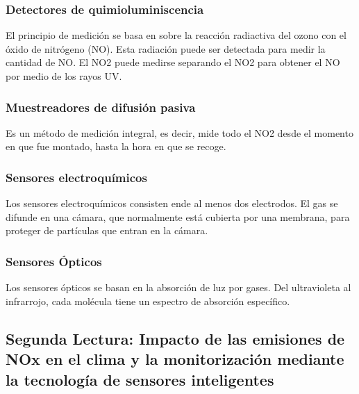 \documentclass[10pt,a4paper]{article}
\begin{document}
\begin{multicols}{2}
\begin{itemize}
\subsubsection{Detectores de quimioluminiscencia}
El principio de medición se basa en sobre la reacción radiactiva
del ozono con el óxido de nitrógeno (NO).
Esta radiación puede ser detectada para medir la
cantidad de NO. El NO2 puede medirse separando
el NO2 para obtener el NO por medio de los
rayos UV.

\subsubsection{Muestreadores de difusión pasiva}
Es un método
de medición integral, es decir, mide todo el NO2
desde el momento en que fue montado, hasta la
hora en que se recoge.


\subsubsection{Sensores electroquímicos}
Los sensores electroquímicos consisten ende al menos dos electrodos.
El gas se difunde en una cámara, que normalmente
está cubierta por una membrana, para
proteger de partículas que entran en la cámara.



\subsubsection{Sensores Ópticos}
Los sensores ópticos se basan
en la absorción de luz por gases. Del ultravioleta
al infrarrojo, cada molécula tiene un espectro
de absorción específico.

\subsection{Segunda Lectura: Impacto de las emisiones de NOx en el clima y la monitorización mediante la tecnología de sensores inteligentes}


\end{itemize}
\end{multicols}
\end{document}
